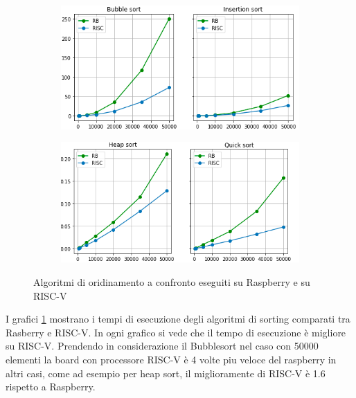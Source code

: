 \documentclass[12pt,a4paper]{report}
\begin{document}
\begin{figure}[ht]
     \centering
     \begin{subfigure}[t]{0.49\textwidth}
         \centering
         \includegraphics[width=\textwidth]{Img/GraficiSorting/BISort_RB.png}
        
     \end{subfigure}
     \hfill
     \begin{subfigure}[t]{0.49\textwidth}
         \centering
         \includegraphics[width=\textwidth]{Img/GraficiSorting/HQSort_RB.png}
         
     \end{subfigure}

   \caption{Algoritmi di oridinamento a confronto eseguiti su Raspberry e su RISC-V}
   \label{Fig:AllSort_RB}
\end{figure}

I grafici \ref{Fig:AllSort_RB} mostrano i tempi di esecuzione degli algoritmi di sorting comparati tra Rasberry e RISC-V. In ogni grafico si vede che il tempo di esecuzione è migliore su RISC-V. Prendendo in considerazione il Bubblesort nel caso con 50000 elementi la board con processore RISC-V è 4 volte piu veloce del raspberry in altri casi, come ad esempio per heap sort, il miglioramente di RISC-V è 1.6 rispetto a Raspberry. 
\end{document}
